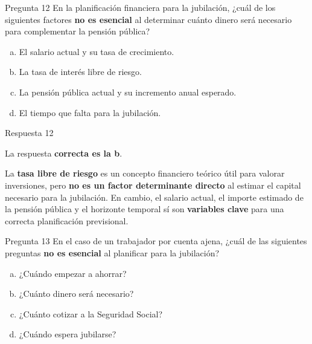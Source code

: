 \documentclass[
  ignorenonframetext,
  aspectratio=54,
  spanish,
]{beamer}
\providecommand{\tightlist}{%
  \setlength{\itemsep}{0pt}\setlength{\parskip}{0pt}}
\begin{document}
\begin{frame}{Pregunta 12}
\label{pregunta-12}
En la planificación financiera para la jubilación, ¿cuál de los
siguientes factores \textbf{no es esencial} al determinar cuánto dinero
será necesario para complementar la pensión pública?

\begin{enumerate}
[a.]
\tightlist
\item
  El salario actual y su tasa de crecimiento.\\
\item
  La tasa de interés libre de riesgo.\\
\item
  La pensión pública actual y su incremento anual esperado.\\
\item
  El tiempo que falta para la jubilación.
\end{enumerate}
\end{frame}

\begin{frame}{Respuesta 12}
\label{respuesta-12}
\begin{tcolorbox}[enhanced jigsaw, rightrule=.15mm, colback=white, arc=.35mm, colframe=quarto-callout-tip-color-frame, leftrule=.75mm, bottomrule=.15mm, left=2mm, toprule=.15mm, opacityback=0, breakable]
\begin{minipage}[t]{5.5mm}
\textcolor{quarto-callout-tip-color}{\faLightbulb}
\end{minipage}%
\begin{minipage}[t]{\textwidth - 5.5mm}

La respuesta \textbf{correcta es la b}.

La \textbf{tasa libre de riesgo} es un concepto financiero teórico útil
para valorar inversiones, pero \textbf{no es un factor determinante
directo} al estimar el capital necesario para la jubilación. En cambio,
el salario actual, el importe estimado de la pensión pública y el
horizonte temporal sí son \textbf{variables clave} para una correcta
planificación previsional.

\end{minipage}%
\end{tcolorbox}
\end{frame}

\begin{frame}{Pregunta 13}
\label{pregunta-13}
En el caso de un trabajador por cuenta ajena, ¿cuál de las siguientes
preguntas \textbf{no es esencial} al planificar para la jubilación?

\begin{enumerate}
[a.]
\tightlist
\item
  ¿Cuándo empezar a ahorrar?\\
\item
  ¿Cuánto dinero será necesario?\\
\item
  ¿Cuánto cotizar a la Seguridad Social?\\
\item
  ¿Cuándo espera jubilarse?
\end{enumerate}
\end{frame}
\end{document}
